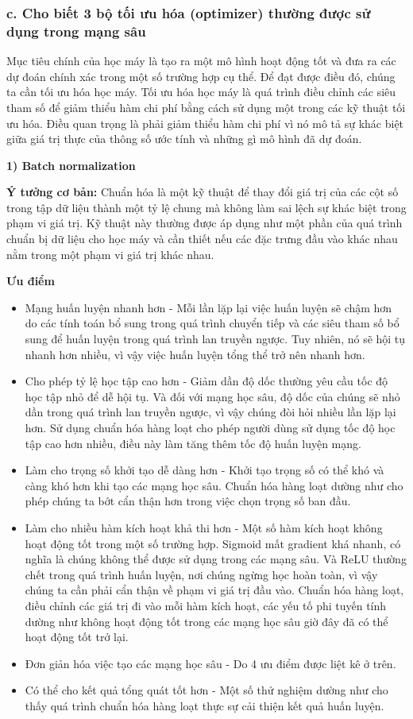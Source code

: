 \documentclass{article}
\begin{document}
	\subsubsection{c. Cho biết 3 bộ tối ưu hóa (optimizer) thường được sử dụng trong mạng sâu}
	\qquad Mục tiêu chính của học máy là tạo ra một mô hình hoạt động tốt và đưa ra các dự đoán chính xác trong một số trường hợp cụ thể. Để đạt được điều đó, chúng ta cần tối ưu hóa học máy. Tối ưu hóa học máy là quá trình điều chỉnh các siêu tham số để giảm thiểu hàm chi phí bằng cách sử dụng một trong các kỹ thuật tối ưu hóa. Điều quan trọng là phải giảm thiểu hàm chi phí vì nó mô tả sự khác biệt giữa giá trị thực của thông số ước tính và những gì mô hình đã dự đoán.
	
	\textbf{1) Batch normalization}
	
	\textbf{Ý tưởng cơ bản:} Chuẩn hóa là một kỹ thuật để thay đổi giá trị của các cột số trong tập dữ liệu thành một tỷ lệ chung mà không làm sai lệch sự khác biệt trong phạm vi giá trị. Kỹ thuật này thường được áp dụng như một phần của quá trình chuẩn bị dữ liệu cho học máy và cần thiết nếu các đặc trưng đầu vào khác nhau nằm trong một phạm vi giá trị khác nhau.
	
	\textbf{Ưu điểm}
	\begin{itemize}
		\item Mạng huấn luyện nhanh hơn - Mỗi lần lặp lại việc huấn luyện sẽ chậm hơn do các tính toán bổ sung trong quá trình chuyển tiếp và các siêu tham số bổ sung để huấn luyện trong quá trình lan truyền ngược. Tuy nhiên, nó sẽ hội tụ nhanh hơn nhiều, vì vậy việc huấn luyện tổng thể trở nên nhanh hơn. 
		\item Cho phép tỷ lệ học tập cao hơn - Giảm dần độ dốc thường yêu cầu tốc độ học tập nhỏ để dễ hội tụ. Và đối với mạng học sâu, độ dốc của chúng sẽ nhỏ dần trong quá trình lan truyền ngược, vì vậy chúng đòi hỏi nhiều lần lặp lại hơn. Sử dụng chuẩn hóa hàng loạt cho phép người dùng sử dụng tốc độ học tập cao hơn nhiều, điều này làm tăng thêm tốc độ huấn luyện mạng. 
		\item Làm cho trọng số khởi tạo dễ dàng hơn - Khởi tạo trọng số có thể khó và càng khó hơn khi tạo các mạng học sâu. Chuẩn hóa hàng loạt dường như cho phép chúng ta bớt cẩn thận hơn trong việc chọn trọng số ban đầu.
		\item Làm cho nhiều hàm kích hoạt khả thi hơn - Một số hàm kích hoạt không hoạt động tốt trong một số trường hợp. Sigmoid mất gradient khá nhanh, có nghĩa là chúng không thể được sử dụng trong các mạng sâu. Và ReLU thường chết trong quá trình huấn luyện, nơi chúng ngừng học hoàn toàn, vì vậy chúng ta cần phải cẩn thận về phạm vi giá trị đầu vào. Chuẩn hóa hàng loạt, điều chỉnh các giá trị đi vào mỗi hàm kích hoạt, các yếu tố phi tuyến tính dường như không hoạt động tốt trong các mạng học sâu giờ đây đã có thể hoạt động tốt trở lại.
		\item Đơn giản hóa việc tạo các mạng học sâu - Do 4 ưu điểm được liệt kê ở trên.
		\item Có thể cho kết quả tổng quát tốt hơn - Một số thử nghiệm dường như cho thấy quá trình chuẩn hóa hàng loạt thực sự cải thiện kết quả huấn luyện.
	\end{itemize}
\end{document}

